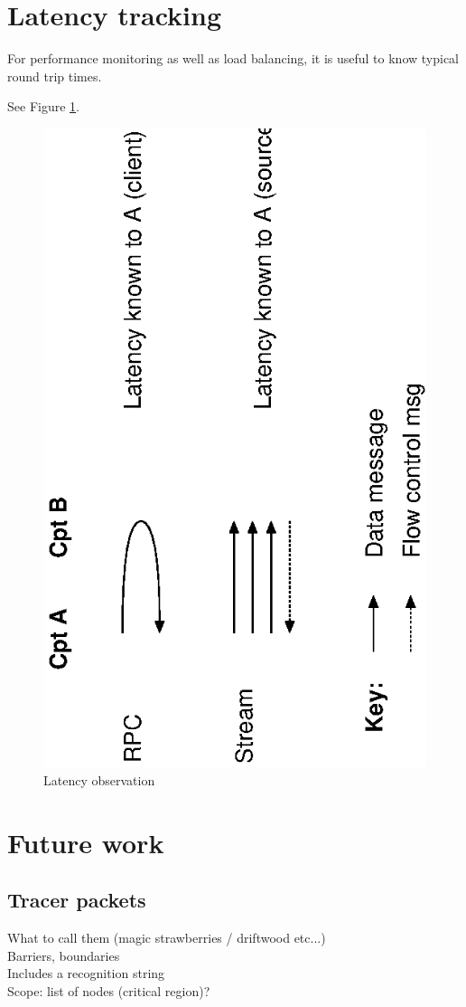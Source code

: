 \documentclass[12pt,a4paper,twoside]{article}
\renewcommand{\_}{\texttt{\symbol{95}}}
\begin{document}
\section{Latency tracking}

For performance monitoring as well as load balancing, it is useful to
know typical round trip times.

See Figure \ref{latency}.

\begin{figure}[h]
\centering
\includegraphics[scale=1.0,angle=-90]{diagrams/latency.eps}
\caption{Latency observation}
\label{latency}
\end{figure}

\section{Future work}

\subsection*{Tracer packets}

What to call them (magic strawberries / driftwood etc...)\\
Barriers, boundaries\\
Includes a recognition string\\
Scope: list of nodes (critical region)?
\end{document}
